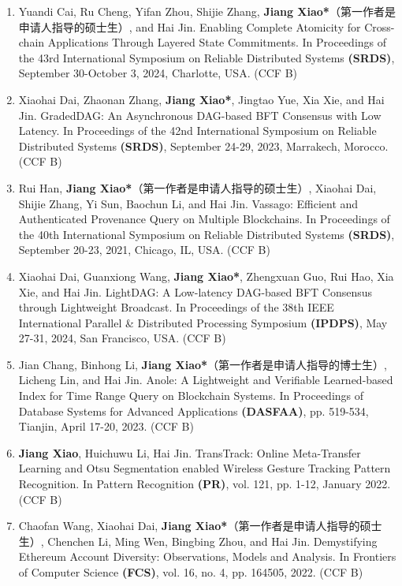 {\begin{enumerate}[itemsep=0pt, topsep=0pt, parsep=0pt]
    \item Yuandi Cai, Ru Cheng, Yifan Zhou, Shijie Zhang, \textbf{Jiang Xiao*}（第一作者是申请人指导的硕士生）, and Hai Jin. Enabling Complete Atomicity for Cross-chain Applications Through Layered State Commitments. In Proceedings of the 43rd International Symposium on Reliable Distributed Systems \textbf{(SRDS)}, September 30-October 3, 2024, Charlotte, USA. (CCF B)

    \item Xiaohai Dai, Zhaonan Zhang, \textbf{Jiang Xiao*}, Jingtao Yue, Xia Xie, and Hai Jin. GradedDAG: An Asynchronous DAG-based BFT Consensus with Low Latency. In Proceedings of the 42nd International Symposium on Reliable Distributed Systems \textbf{(SRDS)}, September 24-29, 2023, Marrakech, Morocco. (CCF B)

    \item Rui Han, \textbf{Jiang Xiao*}（第一作者是申请人指导的硕士生）, Xiaohai Dai, Shijie Zhang, Yi Sun, Baochun Li, and Hai Jin. Vassago: Efficient and Authenticated Provenance Query on Multiple Blockchains. In Proceedings of the 40th International Symposium on Reliable Distributed Systems \textbf{(SRDS)}, September 20-23, 2021, Chicago, IL, USA. (CCF B)

    \item Xiaohai Dai, Guanxiong Wang, \textbf{Jiang Xiao*}, Zhengxuan Guo, Rui Hao, Xia Xie, and Hai Jin. LightDAG: A Low-latency DAG-based BFT Consensus through Lightweight Broadcast. In Proceedings of the 38th IEEE International Parallel \& Distributed Processing Symposium \textbf{(IPDPS)}, May 27-31, 2024, San Francisco, USA. (CCF B)

    \item Jian Chang, Binhong Li, \textbf{Jiang Xiao*}（第一作者是申请人指导的博士生）, Licheng Lin, and Hai Jin. Anole: A Lightweight and Verifiable Learned-based Index for Time Range Query on Blockchain Systems. In Proceedings of Database Systems for Advanced Applications \textbf{(DASFAA)}, pp. 519-534, Tianjin, April 17-20, 2023. (CCF B)

    \item \textbf{Jiang Xiao}, Huichuwu Li, Hai Jin. TransTrack: Online Meta-Transfer Learning and Otsu Segmentation enabled Wireless Gesture Tracking Pattern Recognition. In Pattern Recognition \textbf{(PR)}, vol. 121, pp. 1-12, January 2022. (CCF B)

    \item Chaofan Wang, Xiaohai Dai, \textbf{Jiang Xiao*}（第一作者是申请人指导的硕士生）, Chenchen Li, Ming Wen, Bingbing Zhou, and Hai Jin. Demystifying Ethereum Account Diversity: Observations, Models and Analysis. In Frontiers of Computer Science \textbf{(FCS)}, vol. 16, no. 4, pp. 164505, 2022. (CCF B)


\end{enumerate}}
